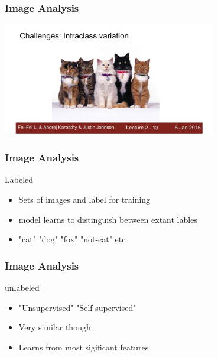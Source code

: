\documentclass[aspectratio=169,usenames,dvipsnames]{beamer}
\begin{document}
\begin{frame}
    \frametitle{Image Analysis}
    \centering
    \vspace{-1.2\baselineskip}
    \includegraphics[width=0.7\textwidth]{Figures/stn8.png}
\end{frame}
\begin{frame}
    \frametitle{Image Analysis}
    \begin{block}{Labeled}
        \begin{itemize}
            \item Sets of images and label for training
            \item model learns to distinguish between extant lables
            \item "cat" "dog" "fox" "not-cat" etc       
        \end{itemize}
    \end{block}
\end{frame}
\begin{frame}
    \frametitle{Image Analysis}
    \begin{block}{unlabeled}
        \begin{itemize}
            \item "Unsupervised" "Self-supervised"
            \item Very similar though.
            \item Learns from most sigificant features      
        \end{itemize}
    \end{block}
\end{frame}
\end{document}
